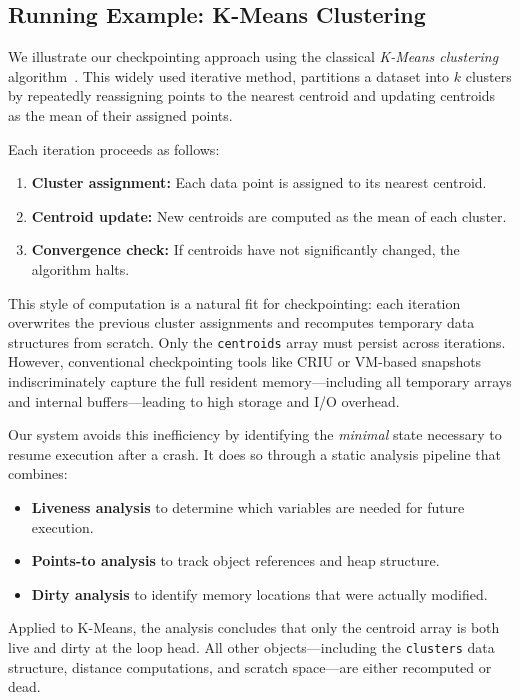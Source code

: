 \subsection{Running Example: K-Means Clustering}
\label{sec:running-example}

We illustrate our checkpointing approach using the classical \emph{K-Means clustering} algorithm~\cite{macqueen1967multivariate}. This widely used iterative method, partitions a dataset into $k$ clusters by repeatedly reassigning points to the nearest centroid and updating centroids as the mean of their assigned points.

Each iteration proceeds as follows:
\begin{enumerate}
    \item \textbf{Cluster assignment:} Each data point is assigned to its nearest centroid.
    \item \textbf{Centroid update:} New centroids are computed as the mean of each cluster.
    \item \textbf{Convergence check:} If centroids have not significantly changed, the algorithm halts.
\end{enumerate}

This style of computation is a natural fit for checkpointing: each iteration overwrites the previous cluster assignments and recomputes temporary data structures from scratch. Only the \texttt{centroids} array must persist across iterations. However, conventional checkpointing tools like CRIU or VM-based snapshots indiscriminately capture the full resident memory---including all temporary arrays and internal buffers---leading to high storage and I/O overhead.

Our system avoids this inefficiency by identifying the \emph{minimal} state necessary to resume execution after a crash. It does so through a static analysis pipeline that combines:
\begin{itemize}
    \item \textbf{Liveness analysis} to determine which variables are needed for future execution.
    \item \textbf{Points-to analysis} to track object references and heap structure.
    \item \textbf{Dirty analysis} to identify memory locations that were actually modified.
\end{itemize}
Applied to K-Means, the analysis concludes that only the centroid array is both live and dirty at the loop head. All other objects---including the \texttt{clusters} data structure, distance computations, and scratch space---are either recomputed or dead.

